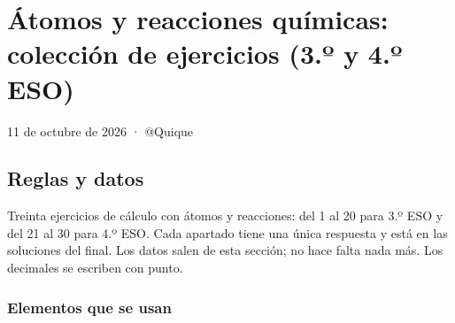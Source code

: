 \section{Átomos y reacciones químicas: colección de ejercicios (3.º y 4.º ESO)}

11 de octubre de 2026 · @Quique

\subsection{Reglas y datos}

Treinta ejercicios de cálculo con átomos y reacciones: del 1 al 20 para 3.º ESO y del 21 al 30 para 4.º ESO. Cada apartado tiene una única respuesta y está en las soluciones del final. Los datos salen de esta sección; no hace falta nada más. Los decimales se escriben con punto.

\subsubsection*{Elementos que se usan}

